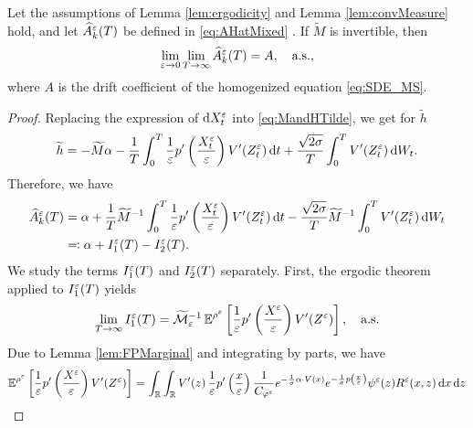 \documentclass[10pt]{article}
\begin{document}
\begin{theorem}\label{thm:mainTheorem} Let the assumptions of Lemma \ref{lem:ergodicity} and Lemma \ref{lem:convMeasure} hold, and let $\widehat A^\varepsilon_k(T)$ be defined in \eqref{eq:AHatMixed} . If $\widetilde M$ is invertible, then
	\begin{equation}
	\lim_{\varepsilon \to 0} \lim_{T \to \infty} \widehat A_k^\varepsilon(T) = A, \quad \text{a.s.},
	\end{equation}
	where $A$ is the drift coefficient of the homogenized equation \eqref{eq:SDE_MS}.
\end{theorem}

\begin{proof} Replacing the expression of $\mathrm{d} X^\varepsilon_t$ into \eqref{eq:MandHTilde}, we get for $\widetilde h$
\begin{equation}\label{Ahat_decomposition}
\widetilde h = -\widetilde M \alpha - \frac{1}{T} \int_0^T \frac{1}{\varepsilon} p' \left ( \frac{X^\varepsilon_t}{\varepsilon} \right ) V'(Z^\varepsilon_t) \,\mathrm{d} t + \frac{\sqrt{2\sigma}}{T} \int_0^T V'(Z^\varepsilon_t) \,\mathrm{d} W_t.
\end{equation}
Therefore, we have
\begin{equation}\label{eq:alphaDecomposition}
\begin{aligned}
	\widehat A^\varepsilon_k(T) &= \alpha + \frac{1}{T} \widetilde M^{-1} \int_0^T \frac{1}{\varepsilon} p' \left ( \frac{X^\varepsilon_t}{\varepsilon} \right ) V'(Z^\varepsilon_t) \,\mathrm{d} t - \frac{\sqrt{2\sigma}}{T}  \widetilde M^{-1} \int_0^T V'(Z^\varepsilon_t) \,\mathrm{d} W_t\\
	&\eqqcolon \alpha + I_1^\varepsilon(T) - I_2^\varepsilon(T).
\end{aligned}
\end{equation}
We study the terms $I_1^\varepsilon(T)$ and $I_2^\varepsilon(T)$ separately. First, the ergodic theorem applied to $I_1^\varepsilon(T)$ yields
\begin{equation}\label{limit_estimator}
\lim_{T \to \infty} I_1^\varepsilon(T) = \widetilde {\mathcal M}_\varepsilon^{-1} \operatorname{\mathbb{E}}^{\rho^\varepsilon} \left [ \frac{1}{\varepsilon} p' \left ( \frac{X^\varepsilon}{\varepsilon} \right ) V'(Z^\varepsilon) \right ], \quad \text{a.s.}
\end{equation}
Due to Lemma \ref{lem:FPMarginal} and integrating by parts, we have
\begin{equation}
\begin{aligned}
	\E^{\rho^\epl} \left [ \frac{1}{\epl} p' \left ( \frac{X^\epl}{\epl} \right ) V'(Z^\epl) \right ] &= \int_{\R} \int_{\R} V'(z) \, \frac1\epl p' \left ( \frac{x}\epl \right ) \frac{1}{C_{\phi^\epl}} e^{- \frac{1}{\sigma} \alpha \cdot V(x)} e^{ - \frac{1}{\sigma} p \left ( \frac{x}\epl \right)} \psi^\epl(z) R^\epl(x,z) \dd x \dd z \\

\end{aligned}
\end{equation}
\end{proof}
\end{document}
